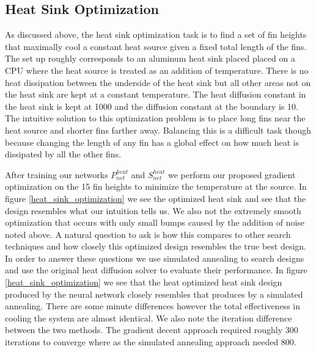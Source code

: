 \documentclass{article} %
\begin{document}
\subsection{Heat Sink Optimization}

As discussed above, the heat sink optimization task is to find a set of fin heights that maximally cool a constant heat source given a fixed total length of the fins. The set up roughly corresponds to an aluminum heat sink placed placed on a CPU where the heat source is treated as an addition of temperature. There is no heat dissipation between the underside of the heat sink but all other areas not on the heat sink are kept at a constant temperature. The heat diffusion constant in the heat sink is kept at 1000 and the diffusion constant at the boundary is 10. The intuitive solution to this optimization problem is to place long fins near the heat source and shorter fins farther away. Balancing this is a difficult task though because changing the length of any fin has a global effect on how much heat is dissipated by all the other fins. 

After training our networks $P^{heat}_{net}$ and $S^{heat}_{net}$ we perform our proposed gradient optimization on the 15 fin heights to minimize the temperature at the source. In figure \ref{heat_sink_optimization} we see the optimized heat sink and see that the design resembles what our intuition tells us. We also not the extremely smooth optimization that occurs with only small bumps caused by the addition of noise noted above. A natural question to ask is how this compares to other search techniques and how closely this optimized design resembles the true best design. In order to answer these questions we use simulated annealing to search designs and use the original heat diffusion solver to evaluate their performance. In figure \ref{heat_sink_optimization} we see that the heat optimized heat sink design produced by the neural network closely resembles that produces by a simulated annealing. There are some minute differences however the total effectiveness in cooling the system are almost identical. We also note the iteration difference between the two methods. The gradient decent approach required roughly 300 iterations to converge where as the simulated annealing approach needed 800.
\end{document}
